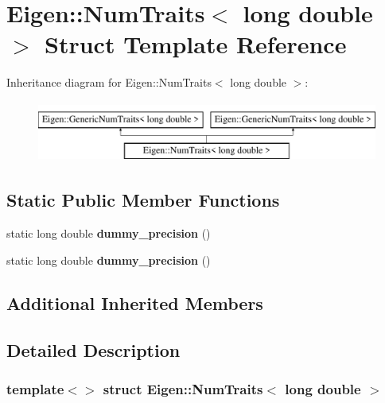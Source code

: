 \hypertarget{struct_eigen_1_1_num_traits_3_01long_01double_01_4}{}\section{Eigen\+:\+:Num\+Traits$<$ long double $>$ Struct Template Reference}
\label{struct_eigen_1_1_num_traits_3_01long_01double_01_4}
Inheritance diagram for Eigen\+:\+:Num\+Traits$<$ long double $>$\+:\begin{figure}[H]
\begin{center}
\leavevmode
\includegraphics[height=2.000000cm]{struct_eigen_1_1_num_traits_3_01long_01double_01_4}
\end{center}
\end{figure}
\subsection*{Static Public Member Functions}
\begin{DoxyCompactItemize}
\item 
\mbox{\label{struct_eigen_1_1_num_traits_3_01long_01double_01_4_a5bf85ab5ecced7609defe19263af11f4}} 
static long double {\bfseries dummy\+\_\+precision} ()
\item 
\mbox{\label{struct_eigen_1_1_num_traits_3_01long_01double_01_4_a5bf85ab5ecced7609defe19263af11f4}} 
static long double {\bfseries dummy\+\_\+precision} ()
\end{DoxyCompactItemize}
\subsection*{Additional Inherited Members}


\subsection{Detailed Description}
\subsubsection*{template$<$$>$\newline
struct Eigen\+::\+Num\+Traits$<$ long double $>$}



